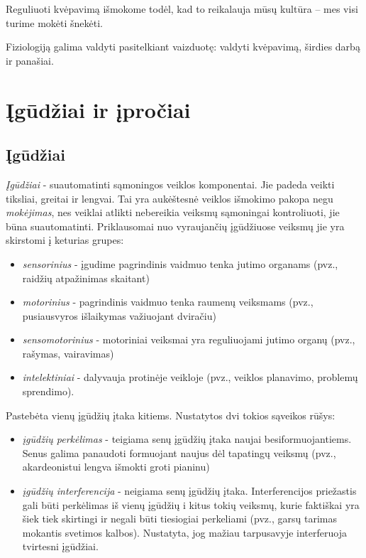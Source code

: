 Reguliuoti kvėpavimą išmokome todėl, kad to reikalauja mūsų kultūra – mes
visi turime mokėti šnekėti.

Fiziologiją galima valdyti pasitelkiant vaizduotę: valdyti kvėpavimą, 
širdies darbą ir panašiai.

\section{Įgūdžiai ir įpročiai}

\label{tema:igudziai}

\subsection{Įgūdžiai}

\emph{Įgūdžiai} - suautomatinti sąmoningos veiklos komponentai. Jie padeda 
veikti tiksliai, greitai ir lengvai. Tai yra aukėštesnė veiklos išmokimo 
pakopa negu \emph{mokėjimas}, nes veiklai atlikti nebereikia veiksmų 
sąmoningai kontroliuoti, jie būna suautomatinti. Priklausomai nuo 
vyraujančių įgūdžiuose veiksmų jie yra skirstomi į keturias grupes:
\begin{itemize}
  \item \emph{sensorinius} - įgudime pagrindinis vaidmuo tenka jutimo
  organams (pvz., raidžių atpažinimas skaitant)
  \item \emph{motorinius} - pagrindinis vaidmuo tenka raumenų veiksmams
  (pvz., pusiausvyros išlaikymas važiuojant dviračiu)
  \item \emph{sensomotorinius} - motoriniai veiksmai yra reguliuojami 
  jutimo organų (pvz., rašymas, vairavimas)
  \item \emph{intelektiniai} - dalyvauja protinėje veikloje (pvz., veiklos 
  planavimo, problemų sprendimo).
\end{itemize}

Pastebėta vienų įgūdžių įtaka kitiems. Nustatytos dvi tokios sąveikos rūšys:
\begin{itemize}
  \item \emph{įgūdžių perkėlimas} - teigiama senų įgūdžių įtaka naujai 
  besiformuojantiems. Senus galima panaudoti formuojant naujus dėl tapatingų
  veiksmų (pvz., akardeonistui lengva išmokti groti pianinu)
  \item \emph{įgūdžių interferencija} - neigiama senų įgūdžių įtaka. 
  Interferencijos priežastis gali būti perkėlimas iš vienų įgūdžių i kitus
  tokių veiksmų, kurie faktiškai yra šiek tiek skirtingi ir negali būti
  tiesiogiai perkeliami (pvz., garsų tarimas mokantis svetimos kalbos). 
  Nustatyta, jog mažiau tarpusavyje interferuoja tvirtesni įgūdžiai.
\end{itemize}

